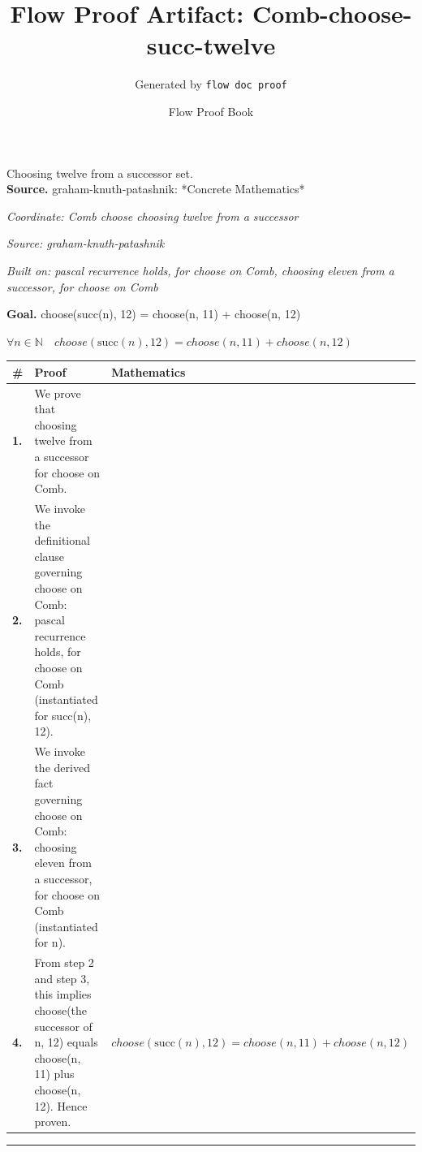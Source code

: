 \documentclass[11pt]{article}
\title{Flow Proof Artifact: Comb-choose-succ-twelve}
\author{Generated by \texttt{flow doc proof}}
\date{Flow Proof Book}
\theoremstyle{definition}
\begin{document}
\maketitle
Choosing twelve from a successor set.\\[0.5em]
\textbf{Source.} graham-knuth-patashnik: *Concrete Mathematics*\\[0.5em]
\bigskip
{}\par
\smallskip\noindent\textit{Coordinate: Comb \cdot choose \cdot choosing twelve from a successor}\par
\smallskip\noindent\textit{Source: graham-knuth-patashnik}\par
\smallskip\noindent\textit{Built on: pascal recurrence holds, for choose on Comb, choosing eleven from a successor, for choose on Comb}\par
\medskip
\noindent\textbf{Goal.} choose(succ(n), 12) = choose(n, 11) + choose(n, 12)\par
\noindent$\displaystyle \forall n \in \mathbb{N}\quad choose(\mathrm{succ}(n), 12) = choose(n, 11) + choose(n, 12)$\par
\medskip
\noindent
\begin{tabular}{@{} >{\raggedright\arraybackslash}p{} >{\raggedright\arraybackslash}p{} >{\raggedleft\arraybackslash}p{} @{}}
\textbf{\#} & \textbf{Proof} & \textbf{Mathematics} \\
\midrule
\textbf{1.} & We prove that choosing twelve from a successor for choose on Comb. & \\[0.45em]
\textbf{2.} & We invoke the definitional clause governing choose on Comb: pascal recurrence holds, for choose on Comb (instantiated for succ(n), 12). & \\[0.45em]
\textbf{3.} & We invoke the derived fact governing choose on Comb: choosing eleven from a successor, for choose on Comb (instantiated for n). & \\[0.45em]
\textbf{4.} & From step 2 and step 3, this implies choose(the successor of n, 12) equals choose(n, 11) plus choose(n, 12). Hence proven. & $\displaystyle choose(\mathrm{succ}(n), 12) = choose(n, 11) + choose(n, 12)$ \\[0.45em]
\bottomrule
\end{tabular}
\label{thm:Comb-choose-choosing_twelve_from_a_successor}
\par\medskip\hrule
\end{document}
